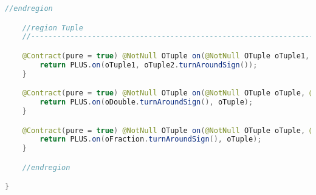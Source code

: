 \begin{lstlisting}[caption=Minus (Falk),label=list:Minus,language=Java]
    //endregion

    //region Tuple
    //------------------------------------------------------------------------------------

    @Contract(pure = true) @NotNull OTuple on(@NotNull OTuple oTuple1, @NotNull OTuple oTuple2) {
        return PLUS.on(oTuple1, oTuple2.turnAroundSign());
    }

    @Contract(pure = true) @NotNull OTuple on(@NotNull OTuple oTuple, @NotNull ODouble oDouble) {
        return PLUS.on(oDouble.turnAroundSign(), oTuple);
    }

    @Contract(pure = true) @NotNull OTuple on(@NotNull OTuple oTuple, @NotNull OFraction oFraction) {
        return PLUS.on(oFraction.turnAroundSign(), oTuple);
    }

    //endregion

}
\end{lstlisting}    

